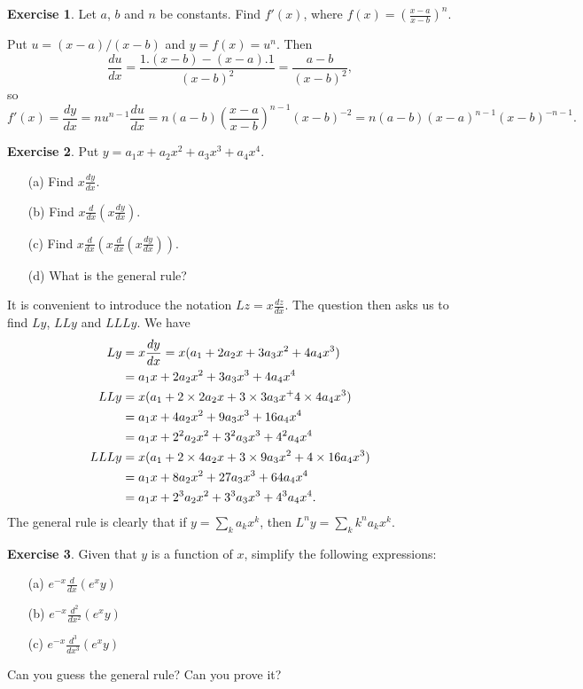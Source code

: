 \documentclass[a4paper]{amsart}
\theoremstyle{definition}
\newtheorem{exercise}{Exercise}[section]
\newenvironment{solution}{{\noindent \bf Solution:}}{}
\begin{document}
\begin{exercise}\label{ex-diff-rat-i}
Let $a$, $b$ and $n$ be constants.  Find $f'(x)$, where 
  $f(x)=\displaystyle{\left(\frac{x-a}{x-b}\right)^n}$.
\end{exercise}
\begin{solution}
  Put $u=(x-a)/(x-b)$ and $y=f(x)=u^n$.  Then 
  \[ \frac{du}{dx} = \frac{1.(x-b) - (x-a).1}{(x-b)^2} = 
      \frac{a-b}{(x-b)^2}, 
  \] 
  so
  \[ f'(x) = \frac{dy}{dx} = nu^{n-1}\frac{du}{dx} = 
      n(a-b)\left(\frac{x-a}{x-b}\right)^{n-1}(x-b)^{-2} = 
      n(a-b)(x-a)^{n-1}(x-b)^{-n-1}.
  \]
\end{solution}
\begin{exercise}\label{ex-radial-diff}
Put $y= a_1x+a_2x^2+a_3x^3+a_4x^4$.
 \begin{itemize}
  \item[(a)] Find $x\frac{dy}{dx}$.
  \item[(b)] Find $x\frac{d}{dx}\left(x\frac{dy}{dx}\right)$.
  \item[(c)] Find
   $x\frac{d}{dx}\left(x\frac{d}{dx}\left(x\frac{dy}{dx}\right)\right)$.
  \item[(d)] What is the general rule?
 \end{itemize}
\end{exercise}
\begin{solution}
It is convenient to introduce the notation $Lz=x\frac{dz}{dx}$.  The
 question then asks us to find $Ly$, $LLy$ and $LLLy$.  We have
 \begin{align*}
  Ly   &= x\frac{dy}{dx} = x(a_1+2a_2x+3a_3x^2+4a_4x^3) \\
       &= a_1x + 2a_2x^2 + 3a_3x^3 + 4a_4x^4 \\
  LLy  &= x(a_1 + 2\times 2a_2x + 3\times 3a_3x^ + 4\times 4a_4x^3) \\
       &= a_1x + 4a_2x^2 + 9 a_3x^3 + 16a_4x^4 \\
       &= a_1x + 2^2a_2x^2 + 3^2 a_3x^3 + 4^2a_4x^4 \\
  LLLy &= x(a_1 + 2\times 4a_2x + 3\times 9a_3x^2 + 4\times 16a_4x^3) \\
       &= a_1x + 8a_2x^2 + 27 a_3x^3 + 64a_4x^4 \\
       &= a_1x + 2^3a_2x^2 + 3^3 a_3x^3 + 4^3a_4x^4.
 \end{align*}
 The general rule is clearly that if $y=\sum_ka_kx^k$, then
 $L^ny=\sum_kk^na_kx^k$.
\end{solution}
\begin{exercise}\label{ex-diffop-conj}
Given that $y$ is a function of $x$, simplify the following expressions:
 \begin{itemize}
  \item[(a)] $e^{-x}\frac{d}{dx}(e^x y)$ 
  \item[(b)] $e^{-x}\frac{d^2}{dx^2}(e^x y)$ 
  \item[(c)] $e^{-x}\frac{d^3}{dx^3}(e^x y)$ 
 \end{itemize}
 Can you guess the general rule?  Can you prove it?
\end{exercise}
\end{document}

